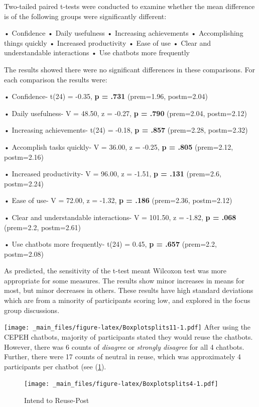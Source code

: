 \documentclass[a4paper, nobind]{templates/ociamthesis}
\begin{document}
Two-tailed paired t-tests were conducted to examine whether the mean difference is of the following groups were significantly different:

• Confidence
• Daily usefulness
• Increasing achievements
• Accomplishing things quickly
• Increased productivity
• Ease of use
• Clear and understandable interactions
• Use chatbots more frequently

The results showed there were no significant differences in these comparisons. For each comparison the results were:

• Confidence- t(24) = -0.35, \textbf{p = .731} (prem=1.96, postm=2.04)

• Daily usefulness- V = 48.50, z = -0.27, \textbf{p = .790} (prem=2.04, postm=2.12)

• Increasing achievements- t(24) = -0.18, \textbf{p = .857} (prem=2.28, postm=2.32)

• Accomplish tasks quickly- V = 36.00, z = -0.25, \textbf{p = .805} (prem=2.12, postm=2.16)

• Increased productivity- V = 96.00, z = -1.51, \textbf{p = .131} (prem=2.6, postm=2.24)

• Ease of use- V = 72.00, z = -1.32, \textbf{p = .186} (prem=2.36, postm=2.12)

• Clear and understandable interactions- V = 101.50, z = -1.82, \textbf{p = .068} (prem=2.2, postm=2.61)

• Use chatbots more frequently- t(24) = 0.45, \textbf{p = .657} (prem=2.2, postm=2.08)

As predicted, the sensitivity of the t-test meant Wilcoxon test was more appropriate for some measures. The results show minor increases in means for most, but minor decreases in others. These results have high standard deviations which are from a minority of participants scoring low, and explored in the focus group discussions.

\texttt{[image: \_main\_files/figure-latex/Boxplotsplits11-1.pdf]}
After using the CEPEH chatbots, majority of participants stated they
would reuse the chatbots. However, there was 6 counts of \emph{disagree} or
\emph{strongly disagree} for all 4 chatbots. Further, there were 17 counts of
neutral in reuse, which was approximately 4 participants per chatbot
(see (\ref{fig:Boxplotsplits4}).

\begin{figure}
\centering
\texttt{[image: \_main\_files/figure-latex/Boxplotsplits4-1.pdf]}
\caption{\label{fig:Boxplotsplits4}Intend to Reuse-Post}
\end{figure}
\end{document}
